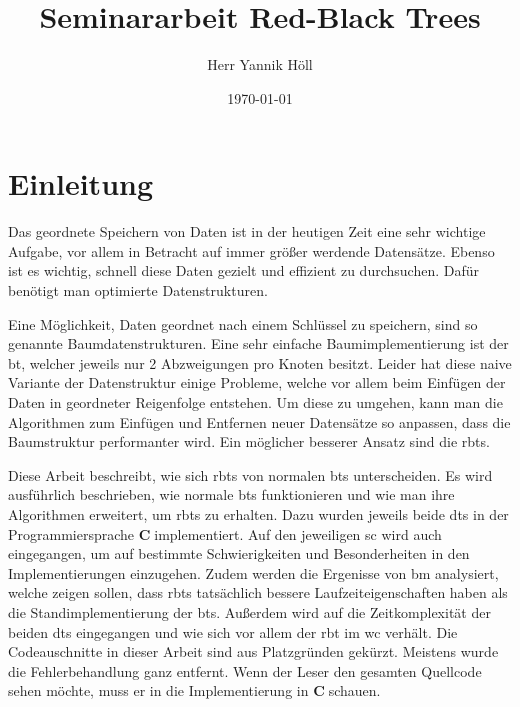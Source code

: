 \documentclass[11pt]{article}
\title{\textbf{Seminararbeit Red-Black Trees}}
\author{Herr Yannik Höll}
\date{\today}
\newcommand{\cpl}{\textbf{C}$\;$}
\begin{document}
\begin{titlingpage}
    \maketitle
\end{titlingpage}
\pagebreak

\tableofcontents
\pagebreak

\listoffigures
\pagebreak

\glsaddall
\printglossary
\pagebreak

\section{Einleitung}

Das geordnete Speichern von Daten ist in der heutigen Zeit eine sehr wichtige Aufgabe, vor allem in Betracht auf immer größer werdende Datensätze.
Ebenso ist es wichtig, schnell diese Daten gezielt und effizient zu durchsuchen. Dafür benötigt man optimierte Datenstrukturen. 

Eine Möglichkeit, Daten geordnet nach einem Schlüssel zu speichern, sind so genannte Baumdatenstrukturen.
Eine sehr einfache Baumimplementierung ist der \gls{bt}, welcher jeweils nur 2 Abzweigungen pro Knoten besitzt.
Leider hat diese naive Variante der Datenstruktur einige Probleme, welche vor allem beim Einfügen der Daten in geordneter Reigenfolge entstehen.
Um diese zu umgehen, kann man die Algorithmen zum Einfügen und Entfernen neuer Datensätze so anpassen, dass die Baumstruktur performanter wird.
Ein möglicher besserer Ansatz sind die \glspl{rbt}.

Diese Arbeit beschreibt, wie sich \glspl{rbt} von normalen \glspl{bt} unterscheiden. Es wird ausführlich beschrieben, wie normale \glspl{bt} funktionieren und wie man
ihre Algorithmen erweitert, um \glspl{rbt} zu erhalten.
Dazu wurden jeweils beide \glspl{dt} in der Programmiersprache \cpl implementiert. Auf den jeweiligen \gls{sc} wird auch eingegangen, um auf bestimmte Schwierigkeiten und Besonderheiten in den Implementierungen einzugehen.
Zudem werden die Ergenisse von \gls{bm} analysiert, welche zeigen sollen, dass \glspl{rbt} tatsächlich bessere Laufzeiteigenschaften haben als
die Standimplementierung der \glspl{bt}.
Außerdem wird auf die Zeitkomplexität der beiden \glspl{dt} eingegangen und wie sich vor allem der \gls{rbt} im \gls{wc} verhält.
Die Codeauschnitte in dieser Arbeit sind aus Platzgründen gekürzt. Meistens wurde die Fehlerbehandlung ganz entfernt.
Wenn der Leser den gesamten Quellcode sehen möchte, muss er in die Implementierung in \cpl schauen. 
\end{document}
